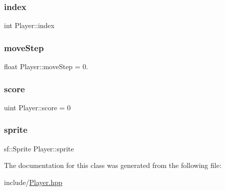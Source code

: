 \mbox{\label{class_player_a1d1f9fee5f774351292af1d0cfa7d65c}} 
\subsubsection{\texorpdfstring{index}{index}}
{\footnotesize\ttfamily int Player\+::index\hspace{0.3cm}{\ttfamily [private]}}

\mbox{\label{class_player_aca3b0c23e14b372078c31cdb7906032c}} 
\subsubsection{\texorpdfstring{moveStep}{moveStep}}
{\footnotesize\ttfamily float Player\+::move\+Step = 0.\hspace{0.3cm}{\ttfamily [private]}}

\mbox{\label{class_player_ab8b3c0ffbde70b09f2ad4d230478f33b}} 
\subsubsection{\texorpdfstring{score}{score}}
{\footnotesize\ttfamily uint Player\+::score = 0\hspace{0.3cm}{\ttfamily [private]}}

\mbox{\label{class_player_a19bc8731e5e84613a2ae7c4b5134dfab}} 
\subsubsection{\texorpdfstring{sprite}{sprite}}
{\footnotesize\ttfamily sf\+::\+Sprite Player\+::sprite\hspace{0.3cm}{\ttfamily [private]}}



The documentation for this class was generated from the following file\+:\begin{DoxyCompactItemize}
\item 
include/\mbox{\hyperlink{_player_8hpp}{Player.\+hpp}}\end{DoxyCompactItemize}
